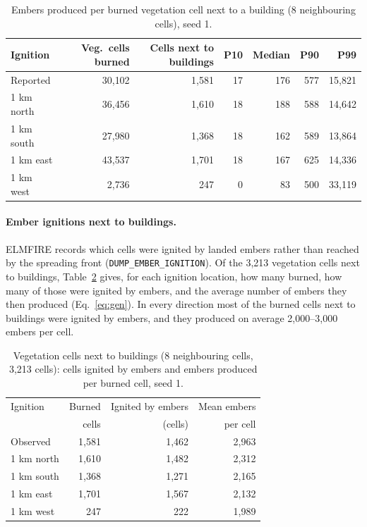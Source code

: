 \begin{table}[htbp]
  \centering
  \caption{Embers produced per burned vegetation cell next to a building (8 neighbouring cells), seed 1.}
  \label{tab:production}
  \small
  \begin{tabular}{@{}lrrrrrr@{}}
    \toprule
    Ignition & Veg.\ cells burned & Cells next to buildings & P10 & Median & P90 & P99 \\
    \midrule
    Reported    & 30{,}102 & 1{,}581 & 17 & 176 & 577 & 15{,}821 \\
    1 km north  & 36{,}456 & 1{,}610 & 18 & 188 & 588 & 14{,}642 \\
    1 km south  & 27{,}980 & 1{,}368 & 18 & 162 & 589 & 13{,}864 \\
    1 km east   & 43{,}537 & 1{,}701 & 18 & 167 & 625 & 14{,}336 \\
    1 km west   &  2{,}736 &   247   &  0 &  83 & 500 & 33{,}119 \\
    \bottomrule
  \end{tabular}
\end{table}

\paragraph{Ember ignitions next to buildings.} ELMFIRE records which cells were ignited by landed
embers rather than reached by the spreading front (\texttt{DUMP\_EMBER\_IGNITION}). Of the 3{,}213
vegetation cells next to buildings, Table~\ref{tab:ignition} gives, for each ignition location, how many
burned, how many of those were ignited by embers, and the average number of embers they then produced
(Eq.~\eqref{eq:gen}). In every direction most of the burned cells next to buildings were ignited by
embers, and they produced on average 2{,}000--3{,}000 embers per cell.

\begin{table}[htbp]
  \centering
  \caption{Vegetation cells next to buildings (8 neighbouring cells, 3{,}213 cells): cells ignited by
  embers and embers produced per burned cell, seed 1.}
  \label{tab:ignition}
  \small
  \begin{tabular}{@{}lrrr@{}}
    \toprule
    Ignition & Burned & Ignited by embers & Mean embers \\
             & cells  & (cells)           & per cell    \\
    \midrule
    Observed    & 1{,}581 & 1{,}462 & 2{,}963 \\
    1 km north  & 1{,}610 & 1{,}482 & 2{,}312 \\
    1 km south  & 1{,}368 & 1{,}271 & 2{,}165 \\
    1 km east   & 1{,}701 & 1{,}567 & 2{,}132 \\
    1 km west   &   247   &   222   & 1{,}989 \\
    \bottomrule
  \end{tabular}
\end{table}


